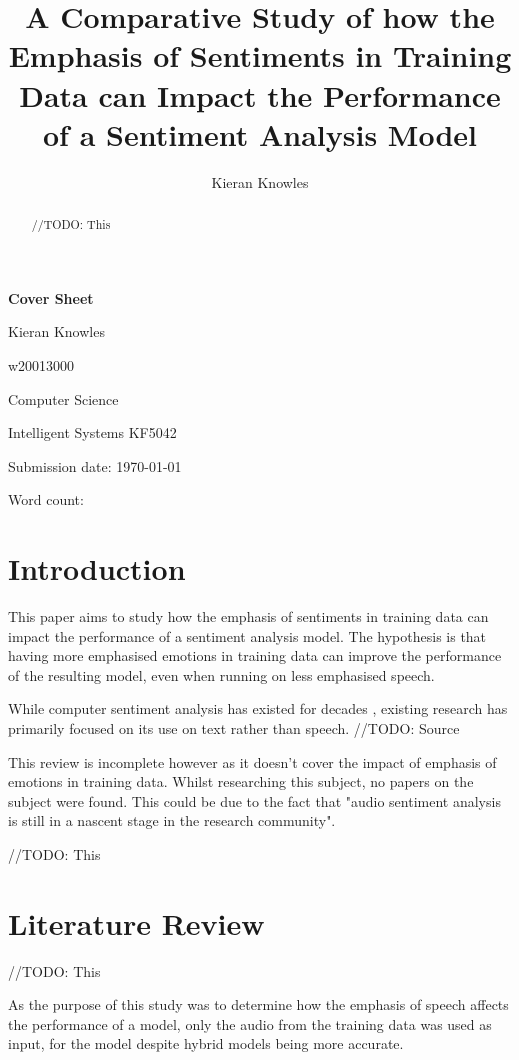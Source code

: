 \documentclass[journal]{IEEEtran}
\newcommand\wordcount{
    
}
\begin{document}
{\Large \textbf{Cover Sheet}}

Kieran Knowles

w20013000

Computer Science

Intelligent Systems KF5042

Submission date: \today

Word count: \wordcount

\title{A Comparative Study of how the Emphasis of Sentiments in Training Data can Impact the Performance of a Sentiment Analysis Model}
\author{Kieran Knowles}
\maketitle


\begin{abstract}
    //TODO: This

\end{abstract}

\section{Introduction}
This paper aims to study how the emphasis of sentiments in training data can impact the performance of a sentiment analysis
model. The hypothesis is that having more emphasised emotions in training data can improve the performance of the resulting
model, even when running on less emphasised speech.

While computer sentiment analysis has existed for decades \cite{stone_computer_1963}, existing research has primarily focused on
its use on text rather than speech. //TODO: Source

This review is incomplete however as it doesn't cover the impact of emphasis of emotions in training data.
Whilst researching this subject, no papers on the subject were found.
This could be due to the fact that "audio sentiment analysis is still in a nascent stage
in the research community". \cite{maghilnan_sentiment_2017}

//TODO: This

\section{Literature Review}

//TODO: This

As the purpose of this study was to determine how the emphasis of speech affects
the performance of a model, only the audio from the training data was used as input,
for the model despite hybrid models being more accurate. \cite{bhaskar_hybrid_2015}
\end{document}

